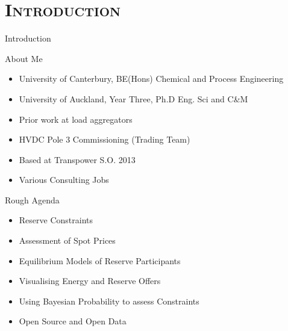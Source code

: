 \documentclass[xcolor=x11names,compress]{beamer}
\renewcommand{\(}{\begin{columns}}
\renewcommand{\)}{\end{columns}}
\newcommand{\<}[1]{\begin{column}{#1}}
\renewcommand{\>}{\end{column}}
\begin{document}
\section{\scshape Introduction}

\begin{frame}{Introduction}
\tableofcontents
\end{frame}

\begin{frame}{About Me}
\begin{itemize}
\item University of Canterbury, BE(Hons) Chemical and Process Engineering
\item University of Auckland, Year Three, Ph.D Eng. Sci and C\&M
\item Prior work at load aggregators
\item HVDC Pole 3 Commissioning (Trading Team)
\item Based at Transpower S.O. 2013
\item Various Consulting Jobs
\end{itemize}
\end{frame}

\begin{frame}{Rough Agenda}
\begin{itemize}
\item Reserve Constraints
\item Assessment of Spot Prices
\item Equilibrium Models of Reserve Participants
\item Visualising Energy and Reserve Offers
\item Using Bayesian Probability to assess Constraints
\item Open Source and Open Data
\end{itemize}
\end{frame}
\end{document}
